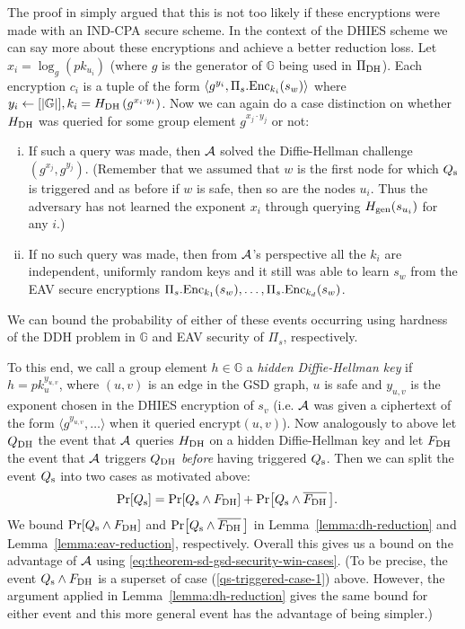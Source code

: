 
The proof in \cite{ttkem} simply argued that this is not too likely if these encryptions were made with an IND-CPA secure scheme. In the context of the DHIES scheme we can say more about these encryptions and achieve a better reduction loss.
Let $x_i = \log_g(pk_{u_i})$ (where $g$ is the generator of $\mathbb{G}$ being used in $\Pi_{\mathrm{DH}}$). Each encryption $c_i$ is a tuple of the form $\langle g^{y_i}, \Pi_s.\mathrm{Enc}_{k_i}(s_w) \rangle$ where $y_i \leftarrow [\lvert\mathbb{G}\rvert], k_i = H_\mathrm{DH}\left(g^{x_i \cdot y_i}\right)$. Now we can again do a case distinction on whether $H_\mathrm{DH}$ was queried for some group element $g^{x_j \cdot y_j}$ or not:
\begin{enumerate}[(i)]
	\item \label{qs-triggered-case-1} If such a query was made, then $\mathcal{A}$ solved the Diffie-Hellman challenge $(g^{x_j}, g^{y_j})$. (Remember that we assumed that $w$ is the first node for which $Q_\mathrm{s}$ is triggered and as before if $w$ is safe, then so are the nodes $u_i$. Thus the adversary has not learned the exponent $x_i$ through querying $H_\mathrm{gen}(s_{u_i})$ for any $i$.)
	\item If no such query was made, then from $\mathcal{A}$'s perspective all the $k_i$ are independent, uniformly random keys and it still was able to learn $s_w$ from the EAV secure encryptions $\Pi_s.\mathrm{Enc}_{k_1}(s_w), \ldots, \Pi_s.\mathrm{Enc}_{k_d}(s_w)$.
\end{enumerate}
We can bound the probability of either of these events occurring using hardness of the DDH problem in $\mathbb{G}$ and EAV security of $\Pi_s$, respectively.

To this end, we call a group element $h \in \mathbb{G}$ a \emph{hidden Diffie-Hellman key} if $h = pk_u^{y_{u, v}}$, where $(u, v)$ is an edge in the GSD graph, $u$ is safe and $y_{u, v}$ is the exponent chosen in the DHIES encryption of $s_v$ (i.e. $\mathcal{A}$ was given a ciphertext of the form $\langle g^{y_{u, v}}, \ldots\rangle$ when it queried $\mathrm{encrypt}(u, v)$). Now analogously to above let $Q_\mathrm{DH}$ the event that $\mathcal{A}$ queries $H_\mathrm{DH}$ on a hidden Diffie-Hellman key and let $F_\mathrm{DH}$ the event that $\mathcal{A}$ triggers $Q_\mathrm{DH}$ \emph{before} having triggered $Q_\mathrm{s}$. Then we can split the event $Q_\mathrm{s}$ into two cases as motivated above:
\begin{align*}
	\pr{\qs} & = \pr{\qs \land \fdh} + \pr{\qs \land \overline{\fdh}\,}.
\end{align*}
We bound $\pr{\qs \land \fdh}$ and $\pr{\qs \land \overline{\fdh} \,}$ in Lemma~\ref{lemma:dh-reduction} and Lemma~\ref{lemma:eav-reduction}, respectively. Overall this gives us a bound on the advantage of $\mathcal{A}$ using \eqref{eq:theorem-sd-gsd-security-win-cases}. (To be precise, the event $Q_\mathrm{s} \land F_\mathrm{DH}$ is a superset of case (\ref{qs-triggered-case-1}) above. However, the argument applied in Lemma~\ref{lemma:dh-reduction} gives the same bound for either event and this more general event has the advantage of being simpler.)


